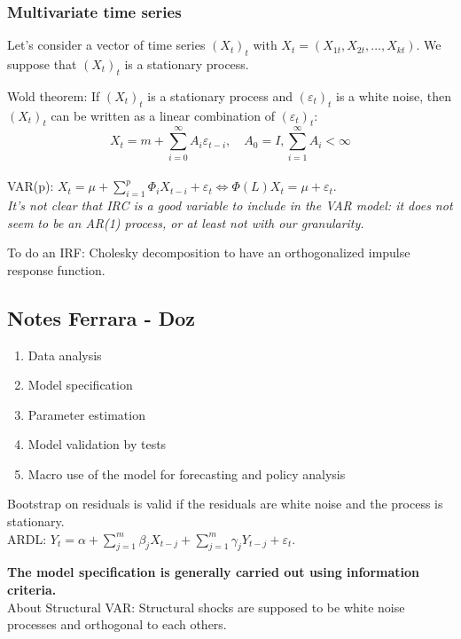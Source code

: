 \subsubsection{Multivariate time series}
Let's consider a vector of time series $(X_t)_t$ with $X_t = (X_{1t}, X_{2t}, \ldots, X_{kt})$. We suppose that $(X_t)_t$ is a stationary process. 

Wold theorem: 
If $(X_t)_t$ is a stationary process and $(\varepsilon_t)_t$ is a white noise, then $(X_t)_t$ can be written as a linear combination of $(\varepsilon_t)_t$: $$X_t = m + \sum_{i=0}^{\infty} A_i \varepsilon_{t-i}, \quad A_0 = I, \sum_{i = 1}^\infty A_i < \infty$$ \\

VAR(p): $X_t = \mu + \sum_{i=1}^{p} \Phi_i X_{t-i} + \varepsilon_t \Leftrightarrow  \Phi(L)X_t = \mu + \varepsilon_t$. \\

\textit{It's not clear that IRC is a good variable to include in the VAR model: it does not seem to be an AR(1) process, or at least not with our granularity.}

To do an IRF: Cholesky decomposition to have an orthogonalized impulse response function.

\subsection{Notes Ferrara - Doz}
\begin{enumerate}
    \item Data analysis
    \item Model specification
    \item Parameter estimation
    \item Model validation by tests
    \item Macro use of the model for forecasting and policy analysis
\end{enumerate}

Bootstrap on residuals is valid if the residuals are white noise and the process is stationary. \\

ARDL: $Y_t = \alpha + \sum_{j=1}^m \beta_j X_{t-j} + \sum_{j=1}^m \gamma_j Y_{t-j} + \varepsilon_t$. 

\textbf{The model specification is generally carried out using
information criteria. }
\\

About Structural VAR: Structural shocks are supposed to be white noise processes and orthogonal to each others.

